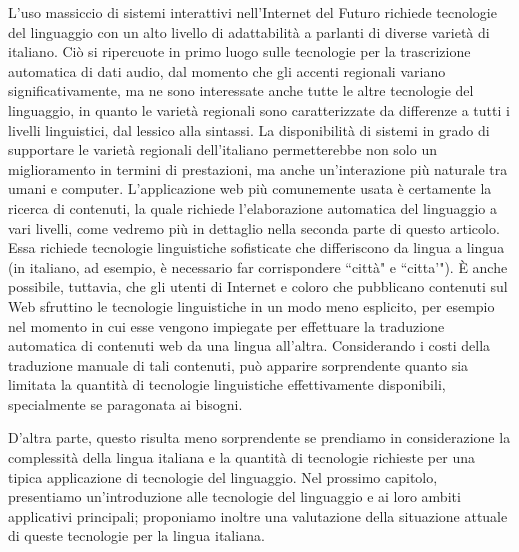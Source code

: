 \begin{multicols}{2}
L'uso massiccio di sistemi interattivi nell'Internet del Futuro richiede
tecnologie del linguaggio con un alto livello di adattabilit\`{a} a parlanti
di diverse variet\`{a} di italiano. Ci\`{o} si ripercuote in primo luogo sulle
tecnologie per la trascrizione automatica di dati audio, dal momento che gli
accenti regionali variano significativamente, ma ne sono interessate anche
tutte le altre tecnologie del linguaggio, in quanto le variet\`{a} regionali
sono caratterizzate da differenze a tutti i livelli linguistici, dal lessico
alla sintassi. La disponibilit\`{a} di sistemi in grado di supportare le
variet\`{a} regionali dell'italiano permetterebbe non solo un miglioramento in
termini di prestazioni, ma anche un'interazione pi\`{u} naturale tra umani e
computer.
L'applicazione web pi\`{u} comunemente usata \`{e} certamente la ricerca di
contenuti, la quale richiede l'elaborazione automatica del linguaggio a vari
livelli, come vedremo pi\`{u} in dettaglio nella seconda parte di questo
articolo. Essa richiede tecnologie linguistiche sofisticate che differiscono
da lingua a lingua (in italiano, ad esempio, \`{e} necessario far
corrispondere “citt\`{a}" e “citta'"). \`{E} anche possibile, tuttavia, che
gli utenti di Internet e coloro che pubblicano contenuti sul Web sfruttino le
tecnologie linguistiche in un modo meno esplicito, per esempio nel momento in
cui esse vengono impiegate per effettuare la traduzione automatica di
contenuti web da una lingua all'altra. Considerando i costi della traduzione
manuale di tali contenuti, pu\`{o} apparire sorprendente quanto sia limitata
la quantit\`{a} di tecnologie linguistiche effettivamente disponibili,
specialmente se paragonata ai bisogni.

D'altra parte, questo risulta meno sorprendente se prendiamo in considerazione
la complessit\`{a} della lingua italiana e la quantit\`{a} di tecnologie
richieste per una tipica applicazione di tecnologie del linguaggio. Nel
prossimo capitolo, presentiamo un'introduzione alle tecnologie del linguaggio
e ai loro ambiti applicativi principali; proponiamo inoltre una valutazione
della situazione attuale di queste tecnologie per la lingua
italiana.



\end{multicols}

\clearpage





